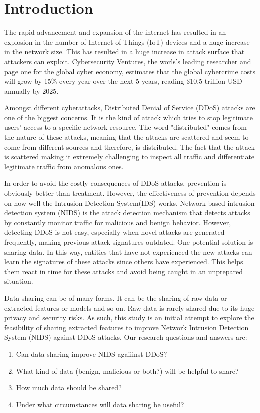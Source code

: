 \section{Introduction}
\label{sec:intro}
\begin{intro}

The rapid advancement and expansion of the internet has resulted in 
an explosion in the number of Internet of Things (IoT) devices and a huge increase in the network size. This has resulted in a huge increase in attack surface that attackers can exploit. Cybersecurity Ventures, the worls's leading researcher and page one for the global cyber economy, estimates that the global cybercrime costs will grow by 15\% every year over the next 5 years, reading \$10.5 trillion USD annually by 2025. 

Amongst different cyberattacks, Distributed Denial of Service (DDoS) attacks are one of the biggest concerns. It is the kind of attack which tries to stop legitimate users' access to a specific network resource. The word "distributed" comes from the nature of these attacks, meaning that the attacks are scattered and seem to come from different sources and therefore, is distributed. The fact that the attack is scattered making it extremely challenging to inspect all traffic and differentiate legitimate traffic from anomalous ones.

In order to avoid the costly consequences of DDoS attacks, prevention is obviously better than treatment. However, the effectiveness of prevention depends on how well the Intrusion Detection System(IDS) works. Network-based intrusion detection system (NIDS) is the attack detection mechanism that detects attacks by constantly monitor traffic for malicious and benign behavior. However, detecting DDoS is not easy, especially when novel attacks are generated frequently, making previous attack signatures outdated. One potential solution is sharing data. In this way, entities that have not experienced the new attacks can learn the  signatures of these attacks since others have experienced. This helps them react in time for these attacks and avoid being caught in an unprepared situation.

Data sharing can be of many forms. It can be the sharing of raw data or extracted features or models and so on. Raw data is rarely shared due to its huge privacy and security risks. As such, this study is an initial attempt to explore the feasibility of sharing extracted features to improve Network Intrusion Detection System (NIDS) against DDoS attacks. Our research questions and answers are:
\begin{enumerate}
    \item Can data sharing improve NIDS agaiiinst DDoS?
    \item What kind of data (benign, malicious or both?) will be helpful to share?
    \item How much data should be shared?
    \item Under what circumstances will data sharing be useful?
    

\end{enumerate}
\end{intro}
